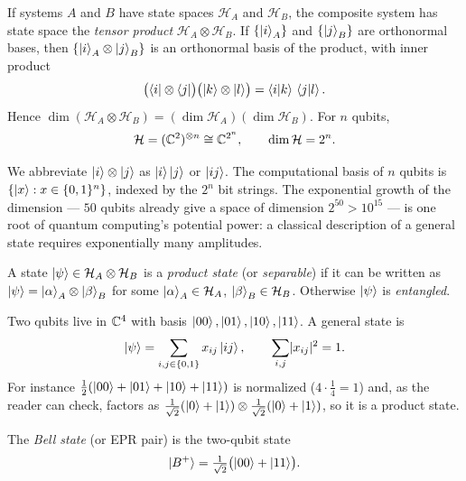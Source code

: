 \begin{definition}\label{l1:def:tensor}
If systems $A$ and $B$ have state spaces $\mathcal{H}_A$ and $\mathcal{H}_B$, the
composite system has state space the \emph{tensor product}
$\mathcal{H}_A\otimes\mathcal{H}_B$. If $\{\ket{i}_A\}$ and $\{\ket{j}_B\}$ are
orthonormal bases, then $\{\ket{i}_A\otimes\ket{j}_B\}$ is an orthonormal basis of the
product, with inner product
\[
  \bigl(\bra{i}\otimes\bra{j}\bigr)\bigl(\ket{k}\otimes\ket{l}\bigr)
    =\braket{i|k}\,\braket{j|l}.
\]
Hence $\dim(\mathcal{H}_A\otimes\mathcal{H}_B)=(\dim\mathcal{H}_A)(\dim\mathcal{H}_B)$.
For $n$ qubits,
\[
  \mathcal{H}=(\mathbb{C}^{2})^{\otimes n}\cong\mathbb{C}^{2^{n}},\qquad \dim\mathcal{H}=2^{n}.
\]
\end{definition}

We abbreviate $\ket{i}\otimes\ket{j}$ as $\ket{i}\ket{j}$ or $\ket{ij}$. The
computational basis of $n$ qubits is $\{\ket{x}:x\in\{0,1\}^{n}\}$, indexed by the
$2^{n}$ bit strings. The exponential growth of the dimension --- $50$ qubits already
give a space of dimension $2^{50}>10^{15}$ --- is one root of quantum computing's
potential power: a classical description of a general state requires exponentially
many amplitudes.

\begin{definition}\label{l1:def:product}
A state $\ket{\psi}\in\mathcal{H}_A\otimes\mathcal{H}_B$ is a \emph{product state}
(or \emph{separable}) if it can be written as $\ket{\psi}=\ket{\alpha}_A\otimes\ket{\beta}_B$
for some $\ket{\alpha}_A\in\mathcal{H}_A$, $\ket{\beta}_B\in\mathcal{H}_B$. Otherwise
$\ket{\psi}$ is \emph{entangled}.
\end{definition}

\begin{example}
Two qubits live in $\mathbb{C}^{4}$ with basis $\ket{00},\ket{01},\ket{10},\ket{11}$. A
general state is
\[
  \ket{\psi}=\sum_{i,j\in\{0,1\}}x_{ij}\ket{ij},\qquad
  \sum_{i,j}\lvert x_{ij}\rvert^{2}=1 .
\]
For instance $\tfrac12(\ket{00}+\ket{01}+\ket{10}+\ket{11})$ is normalized
($4\cdot\tfrac14=1$) and, as the reader can check, factors as
$\tfrac{1}{\sqrt2}(\ket{0}+\ket{1})\otimes\tfrac{1}{\sqrt2}(\ket{0}+\ket{1})$, so it
is a product state.
\end{example}

\begin{definition}\label{l1:def:bell}
The \emph{Bell state} (or EPR pair) is the two-qubit state
\begin{equation}
  \ket{B^{+}}=\tfrac{1}{\sqrt2}\bigl(\ket{00}+\ket{11}\bigr).
\end{equation}
\end{definition}

